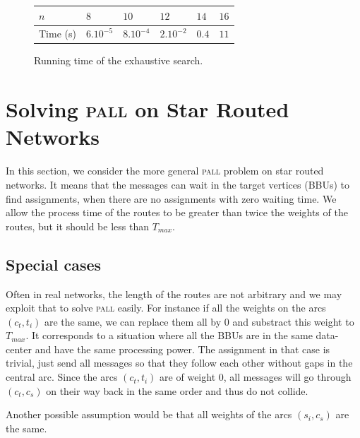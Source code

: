 \documentclass[10pt, conference, letterpaper]{IEEEtran}
\newcommand\pall{\textsc{pall}\xspace}
\begin{document}
      \begin{figure}
         \begin{center}
         \begin{tabularx}{0.5\textwidth}{|l|X|X|X|X|X|}
    \hline
   $n$ & $8$ & $10$& $12$&$14$& $16$\\
    \hline
   Time (s) & $6.10^{-5}$&$8.10^{-4}$&$2.10^{-2}$& $0.4$& $11$\\
    \hline
      \end{tabularx}
      \end{center}
      \caption{Running time of the exhaustive search.}
      \end{figure}
      
         \section{Solving \pall on Star Routed Networks}\label{sec:PALL}
    
    In this section, we consider the more general \pall problem on star routed networks. It means that the messages can wait in the target vertices (BBUs) to find assignments, when there are no assignments with zero waiting time. We allow the process time of the routes to be greater than twice the weights of the routes, but it should be less than $T_{max}$.

	\subsection{Special cases}
		
		
	Often in real networks, the length of the routes are not arbitrary and we may exploit that to solve \pall easily. For instance if all the weights on the arcs $(c_t,t_i)$ are the same, we can replace them all by $0$ and substract this weight to $T_{max}$. It corresponds to a situation where all the BBUs are in the same data-center and have the same processing power.
	The assignment in that case is trivial, just send all messages so that they follow each other without gaps in the central arc. Since the arcs $(c_t,t_i)$ are of weight $0$, all messages will go through $(c_t,c_s)$ on their way back in
	the same order and thus do not collide. 
	
	Another possible assumption would be that all weights of the arcs $(s_i,c_s)$ are the same.
	
\end{document}
